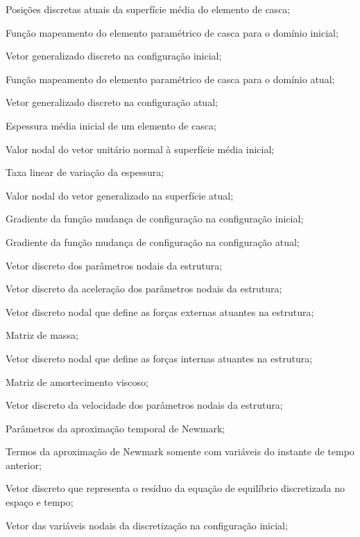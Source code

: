 \begin{simbolos}
   \item[$\ePosition^{mh}$] Posições discretas atuais da superfície média do elemento de casca;
   \item[$\fmap^{h}_{0}$] Função mapeamento do elemento paramétrico de casca para o domínio inicial;
   \item[$\mathbf{g}^{h}_{0}$] Vetor generalizado discreto na configuração inicial;
   \item[$\fmap^{h}_{1}$] Função mapeamento do elemento paramétrico de casca para o domínio atual;
   \item[$\mathbf{g}^{h}_{1}$] Vetor generalizado discreto na configuração atual;
   \item[$h_{0}$] Espessura média inicial de um elemento de casca;
   \item[$\mathbf{e}_x$] Valor nodal do vetor unitário normal à superfície média inicial;
   \item[$\eta$] Taxa linear de variação da espessura;
   \item[$\mathbf{e}_y$] Valor nodal do vetor generalizado na superfície atual;
   \item[$\gradDeformation_0$] Gradiente da função mudança de configuração na configuração inicial;
   \item[$\gradDeformation_1$] Gradiente da função mudança de configuração na configuração atual;
   \item[$\SolidPos$] Vetor discreto dos parâmetros nodais da estrutura;
   \item[$\mathbf{\ddot{Y}}$] Vetor discreto da aceleração dos parâmetros nodais da estrutura;
   \item[$\concLoad^{ext}$] Vetor discreto nodal que define as forças externas atuantes na estrutura;
   \item[$\solidMass$] Matriz de massa;
   \item[$\concLoad^{int}$] Vetor discreto nodal que define as forças internas atuantes na estrutura;
   \item[$\mathbf{C}_v$] Matriz de amortecimento viscoso;
   \item[$\SolidVel_{}$] Vetor discreto da velocidade dos parâmetros nodais da estrutura;
   \item[$\beta,\gamma$] Parâmetros da aproximação temporal de Newmark;
   \item[$\mathbf{Q}_n$,$\mathbf{R}_n$] Termos da aproximação de Newmark somente com variáveis do instante de tempo anterior;
   \item[$\NNSS$] Vetor discreto que representa o resíduo da equação de equilíbrio discretizada no espaço e tempo;
   \item[$\mathbf{X}$] Vetor das variáveis nodais da discretização na configuração inicial;
   

\end{simbolos}
